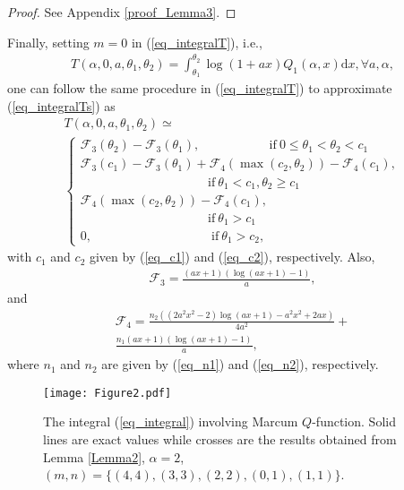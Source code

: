\begin{proof}
See Appendix \ref{proof_Lemma3}.
\end{proof}

Finally, setting $m = 0$ in (\ref{eq_integralT}), i.e.,
\begin{align}\label{eq_integralTs}
     T(\alpha,0,a,\theta_1,\theta_2) = \int_{\theta_1}^{\theta_2} \log(1+ax)Q_1(\alpha,x)\text{d}x,  \forall a,\alpha,
\end{align}
one can follow the same procedure in (\ref{eq_integralT}) to approximate (\ref{eq_integralTs}) as
\begin{align}\label{eq_integralTss}
  T(\alpha,0,a,\theta_1,\theta_2)\simeq~~~~~~~~~~~~~~~~~~~~~~~~~~~~~~~~~~~~~~~~~~~~~~~~~~\nonumber\\
\begin{cases}
\mathcal{F}_3(\theta_2)-\mathcal{F}_3(\theta_1), ~~~~~~~~~~~~~~~~~~~~~~~~~\mathrm{if}~  0\leq\theta_1<\theta_2 < c_1  \\ 
\mathcal{F}_3(c_1)-\mathcal{F}_3(\theta_1)+\mathcal{F}_4(\max(c_2,\theta_2))-\mathcal{F}_4(c_1),  \\~~~~~~~~~~~~~~~~~~~~~~~~~~~~~~~~~~~~~~~~~~~~~~\mathrm{if}~ \theta_1<c_1, \theta_2\geq c_1\\
 \mathcal{F}_4(\max(c_2,\theta_2))-\mathcal{F}_4(c_1), \\~~~~~~~~~~~~~~~~~~~~~~~~~~~~~~~~~~~~~~~~~~~~~~\mathrm{if}~ \theta_1>c_1\\
0, ~~~~~~~~~~~~~~~~~~~~~~~~~~~~~~~~~~~~~~~~~~~\mathrm{if}~ \theta_1 > c_2,
\end{cases}  
\end{align}
with $c_1$ and $c_2$ given by (\ref{eq_c1}) and (\ref{eq_c2}), respectively. Also,
\begin{align}
    \mathcal{F}_3 = \frac{(ax+1)(\log(ax+1)-1)}{a},
\end{align}
and
\begin{align}
    \mathcal{F}_4 = \frac{n_2\left((2a^2x^2-2)\log(ax+1)-a^2x^2+2ax\right)}{4a^2}+\nonumber\\\frac{n_1(ax+1)(\log(ax+1)-1)}{a},
\end{align}
where $n_1$ and $n_2$ are given by (\ref{eq_n1}) and (\ref{eq_n2}), respectively.


\begin{figure}
\centering
  \texttt{[image: Figure2.pdf]}\\
\caption{The  integral (\ref{eq_integral}) involving Marcum $Q$-function. Solid lines are exact values while crosses are the results obtained from Lemma \ref{Lemma2}, $\alpha = 2$,  $(m,n) = \{(4,4), (3,3), (2,2), (0,1), (1,1)\}$.}\label{fig_integrald}
\end{figure}


